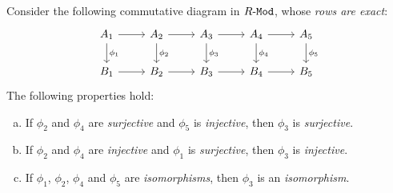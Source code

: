 \begin{proposition}
\label{prop:five-lemma}
Consider the following commutative diagram in \({R\text{-}\texttt{Mod}}\), whose \emph{rows are
  exact}:
\[
\begin{tikzcd}
A_1 \ar[r] \ar[d, "\phi_1"]
&A_2 \ar[r] \ar[d, "\phi_2"]
&A_3 \ar[r] \ar[d, "\phi_3"]
&A_4 \ar[r] \ar[d, "\phi_4"]
&A_5 \ar[d, "\phi_5"]
\\
B_1 \ar[r]
&B_2 \ar[r]
&B_3 \ar[r]
&B_4 \ar[r]
&B_5
\end{tikzcd}
\]
The following properties hold:
\begin{enumerate}[(a)]\setlength\itemsep{0em}
\item If \(\phi_2\) and \(\phi_4\) are \emph{surjective} and \(\phi_5\) is
  \emph{injective}, then \(\phi_3\) is \emph{surjective}.
\item If \(\phi_2\) and \(\phi_4\) are \emph{injective} and \(\phi_1\) is
  \emph{surjective}, then \(\phi_3\) is \emph{injective}.
\item If \(\phi_1\), \(\phi_2\), \(\phi_4\) and \(\phi_5\) are
  \emph{isomorphisms}, then \(\phi_3\) is an \emph{isomorphism}.
\end{enumerate}
\end{proposition}

